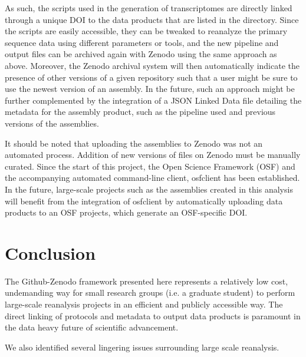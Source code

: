 \documentclass[12pt]{article}
\begin{document}
As such, the scripts used in the generation of transcriptomes are
directly linked through a unique DOI to the data products that are
listed in the directory. Since the scripts are easily accessible, they
can be tweaked to reanalyze the primary sequence data using different
parameters or tools, and the new pipeline and output files can be
archived again with Zenodo using the same approach as above.
Moreover, the Zenodo archival system will then automatically indicate
the presence of other versions of a given repository such that a user
might be sure to use the newest version of an assembly. In the future,
such an approach might be further complemented by the integration of a
JSON Linked Data file detailing the metadata for the assembly product,
such as the pipeline used and previous versions of the assemblies.

It should be noted that uploading the assemblies to Zenodo was not an automated process. Addition of new versions of files on Zenodo must be manually curated. Since the start of this project, the Open Science Framework (OSF) and the accompanying automated command-line client, osfclient has been established. In the future, large-scale projects such as the assemblies created in this analysis will benefit from the integration of osfclient by automatically uploading data products to an OSF projects, which generate an OSF-specific DOI.

\section{Conclusion}

The Github-Zenodo framework presented here represents a relatively low
cost, undemanding way for small research groups (i.e. a graduate
student) to perform large-scale reanalysis projects in an efficient
and publicly accessible way. The direct linking of protocols and
metadata to output data products is paramount in the data heavy future
of scientific advancement.

We also identified several lingering issues surrounding large scale
reanalysis.
\end{document}
